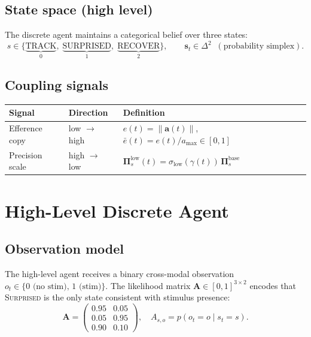 \documentclass[11pt, a4paper]{article}
\newcommand{\vect}[1]{\bm{#1}}
\newcommand{\mat}[1]{\mathbf{#1}}
\newcommand{\norm}[1]{\left\|#1\right\|}
\newcommand{\Pisl}{\mat{\Pi}_s^{\text{low}}}
\begin{document}
\subsection{State space (high level)}
The discrete agent maintains a categorical belief over three states:
\begin{equation}
  s \in \{\underbrace{\text{TRACK}}_{0},\;
          \underbrace{\text{SURPRISED}}_{1},\;
          \underbrace{\text{RECOVER}}_{2}\},
  \qquad
  \vect{s}_t \in \Delta^2 \;\;(\text{probability simplex}).
\end{equation}

\subsection{Coupling signals}
\begin{center}
\renewcommand{\arraystretch}{1.4}
\begin{tabular}{lll}
\toprule
\textbf{Signal} & \textbf{Direction} & \textbf{Definition} \\
\midrule
Efference copy & low $\to$ high &
  $e(t) = \norm{\vect{a}(t)}$,\quad
  $\bar{e}(t) = e(t)/a_{\max} \in [0,1]$ \\
Precision scale & high $\to$ low &
  $\Pisl(t) = \sigma_{\text{low}}(\gamma(t))\,\mat{\Pi}_s^{\text{base}}$ \\
\bottomrule
\end{tabular}
\end{center}

\section{High-Level Discrete Agent}
\label{sec:high}

\subsection{Observation model}
The high-level agent receives a binary cross-modal observation
$o_t \in \{0\text{ (no stim)},\, 1\text{ (stim)}\}$.
The likelihood matrix $\mat{A} \in [0,1]^{3\times 2}$ encodes that
\textsc{Surprised} is the only state consistent with stimulus presence:
\begin{equation}
  \mat{A} =
  \begin{pmatrix}
    0.95 & 0.05 \\
    0.05 & 0.95 \\
    0.90 & 0.10
  \end{pmatrix},
  \quad
  A_{s,o} = p(o_t = o \mid s_t = s).
\end{equation}
\end{document}
